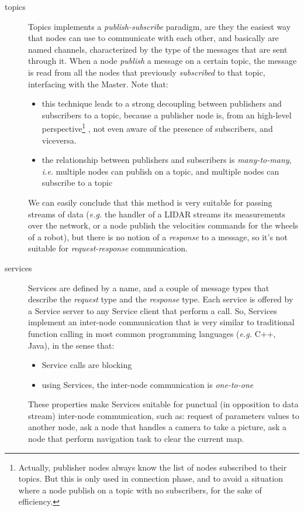 \begin{description}
\item[topics] Topics implements a \textit{publish-subscribe} paradigm, are they the easiest way that nodes can use to communicate with each other, and basically are named channels, characterized by the type of the messages that are sent through it. When a node \textit{publish} a message on a certain topic, the message is read from all the nodes that previously \textit{subscribed} to that topic, interfacing with the Master. Note that:
\begin{itemize}
	\item this technique leads to a strong decoupling between publishers and subscribers to a topic, because a publisher node is, from an high-level perspective\footnote{Actually, publisher nodes always know the list of nodes subscribed to their topics. But this  is only used in connection phase, and to avoid a situation where a node publish on a topic with no subscribers, for the sake of efficiency.}
	, not even aware of the presence of subscribers, and viceversa.
	\item the relationship between publishers and subscribers is \textit{many-to-many}, \textit{i.e.} multiple nodes can publish on a topic, and multiple nodes can subscribe to a topic
\end{itemize}
We can easily conclude that this method is very suitable for passing streams of data (\textit{e.g.} the handler of a \ac{LIDAR} streams its measurements over the network, or a node publish the velocities commands for the wheels of a robot), but there is no notion of a \textit{response} to a message, so it's not suitable for \textit{request-response} communication.

\item[services] Services are defined by a name, and a couple of message types that describe the \textit{request} type and the \textit{response} type. Each service is offered by a Service server to any Service client that perform a call. So, Services implement an inter-node communication that is very similar to traditional function calling in most common programming languages (\textit{e.g.} C++, Java), in the sense that:
\begin{itemize}
	\item Service calls are blocking
	\item using Services, the inter-node communication is \textit{one-to-one}
\end{itemize}
These properties make Services suitable for punctual (in opposition to data stream) inter-node communication, such as: request of parameters values to another node, ask a node that handles a camera to take a picture, ask a node that perform navigation task to clear the current map.


\end{description}

